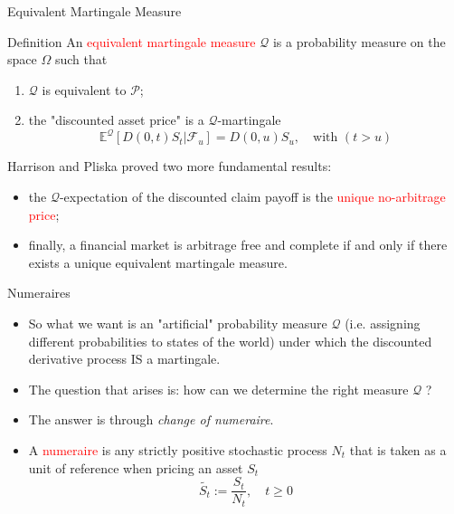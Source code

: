\documentclass{beamer}
\begin{document}
\begin{frame}{Equivalent Martingale Measure}
	\begin{block}{Definition}
	An \textcolor{red}{equivalent martingale measure} $\mathcal{Q}$ is a probability measure on the space $\Omega$ such that
	\begin{enumerate}
		\item $\mathcal{Q}$ is equivalent to $\mathcal{P}$;
		\item the "discounted asset price" is a $\mathcal{Q}$-martingale
		\begin{equation}
			\mathbb{E}^\mathcal{Q}[D(0,t)S_t|\mathcal{F}_u] = D(0,u)S_u, \quad\text{with }(t>u)
		\end{equation}
	\end{enumerate}
	\end{block}
Harrison and Pliska proved two more fundamental results:
\begin{itemize}
	\item the $\mathcal{Q}$-expectation of the discounted claim payoff is the \textcolor{red}{unique no-arbitrage price};
	\item finally, a financial market is arbitrage free and complete if and only if there exists a unique equivalent martingale measure.
\end{itemize}
\end{frame}

\begin{frame}{Numeraires}
	\begin{itemize}
		\item So what we want is an "artificial" probability measure $\mathcal{Q}$ (i.e. assigning different probabilities to states of the world) under which the discounted derivative process IS a martingale.
		\item The question that arises is: how can we determine the right measure $\mathcal{Q}$ ?
		\item The answer is through \emph{change of numeraire}.
		\item A \textcolor{red}{numeraire} is any strictly positive stochastic process $N_t$ that is taken as a unit of reference when pricing an asset $S_t$
		\begin{equation*}
			\tilde{S_t}:=\frac{S_t}{N_t}, \quad t \ge 0
		\end{equation*}
	\end{itemize}
\end{frame}
\end{document}
